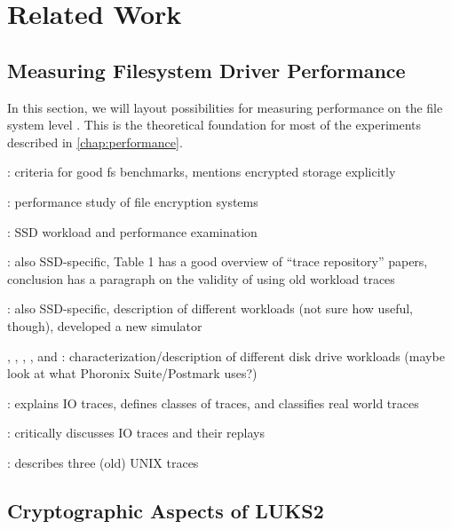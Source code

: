 \section{Related Work}
\label{chap:relatedwork}

\subsection{Measuring Filesystem Driver Performance}
\label{chap:relatedwork.fsperformance}
In this section, we will layout possibilities for measuring performance on the file system level . This is the theoretical foundation for most of the experiments described in \autoref{chap:performance}.

\cite{Traeger2008}: criteria for good fs benchmarks, mentions encrypted storage explicitly

\cite{Wright2003}: performance study of file encryption systems

\cite{Agrawal2008}: SSD workload and performance examination

\cite{Yadgar2021}: also SSD-specific, Table 1 has a good overview of ``trace repository'' papers, conclusion has a paragraph on the validity of using old workload traces

\cite{He2017}: also SSD-specific, description of different workloads (not sure how useful, though), developed a new simulator

\cite{Riska2006}, \cite{Riska2006a}, \cite{Leung2008}, \cite{Riska2009}, and \cite{Sehgal2010}: characterization/description of different disk drive workloads (maybe look at what Phoronix Suite/Postmark uses?)

\cite{Seo2014}: explains IO traces, defines classes of traces, and classifies real world traces

\cite{Pereira2013}: critically discusses IO traces and their replays

\cite{Ruemmler1993}: describes three (old) UNIX traces

\subsection{Cryptographic Aspects of LUKS2}
\label{chap:relatedwork.cryptography}

